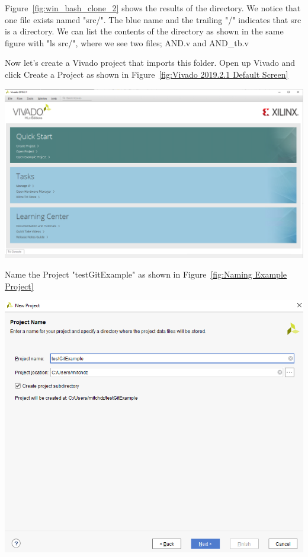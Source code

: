 \documentclass[12pt]{article}
\begin{document}
Figure~\ref{fig:win_bash_clone_2} shows the results of the directory. We notice that one file exists named "src/". The blue name and the trailing "/" indicates that src is a directory. We can list the contents of the directory as shown in the same figure with "ls src/", where we see two files; AND.v and AND{\_}tb.v

Now let's create a Vivado project that imports this folder. Open up Vivado and click Create a Project as shown in Figure~\ref{fig:Vivado 2019.2.1 Default Screen}

\begin{center}
    \includegraphics[scale=0.3]{viv_01.PNG}
    \label{fig:Vivado 2019.2.1 Default Screen}
\end{center}

Name the Project "testGitExample" as shown in Figure~\ref{fig:Naming Example Project}

\begin{center}
    \includegraphics[scale=0.4]{viv_02.PNG}
    \label{fig:Naming Example Project}
\end{center}
\end{document}
